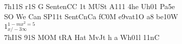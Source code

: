 \documentclass{article}%
\begin{document}
%
\normalsize%
7h11S r1S G SentenCC 1t MUSt A111 4he Uh01 Pa5e\\
SO We Can SP11t SentCnCa fC0M e9vat1O a8 be10W\\
$1_{x / - 3 \infty}^{1 - m x^{2} = 5}$\\
7hI1S 91S MOM tRA Hat MvJt h a Wh01l 11nC\\%
\end{document}
